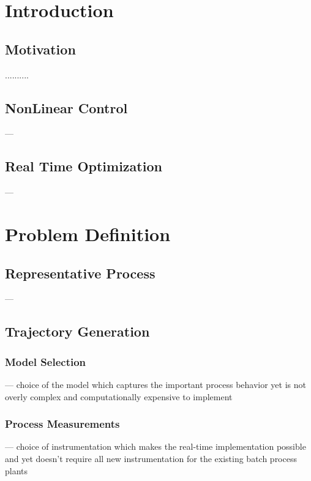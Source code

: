\documentclass[11pt]{report}
\begin{document}
\bodyoftext


\chapter{Introduction}

\section{Motivation}

..........

\section{NonLinear Control}

---

\section{Real Time Optimization}

---

\chapter{Problem Definition}

\section{Representative Process}

---

\section{Trajectory Generation}

\subsection{Model Selection}

--- choice of the model which captures the important process behavior yet is
not overly complex and computationally expensive to implement

\subsection{Process Measurements}

--- choice of instrumentation which makes the real-time implementation
possible and yet doesn't require all new instrumentation for the existing
batch process plants
\end{document}
